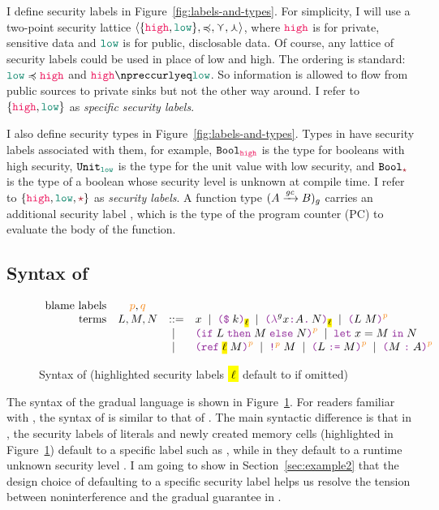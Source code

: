 I define security labels in Figure~\ref{fig:labels-and-types}. For simplicity, I
will use a two-point security lattice $\langle \{\high, \low\} , \preccurlyeq,
\curlyvee , \curlywedge \rangle$, where $\high$ is for private, sensitive data
and $\low$ is for public, disclosable data. Of course, any lattice of security
labels could be used in place of low and high. The ordering is standard: $\low
\preccurlyeq \high$ and $\high \npreccurlyeq \low$. So information is allowed to
flow from public sources to private sinks but not the other way around. I refer
to $\{\high,\low\}$ as \emph{specific security labels}.

I also define security types in Figure~\ref{fig:labels-and-types}. Types in
\Surface have security labels associated with them, for example, $\Bool_{\high}$
is the type for booleans with high security, $\Unit_{\low}$ is the type for the
unit value with low security, and $\Bool_{\unk}$ is the type of a boolean whose
security level is unknown at compile time. I refer to $\{\high,\low,\unk\}$ as
\emph{security labels}. A function type $({A}\xrightarrow{{\mathit{gc}}}{B})_g$ carries an
additional security label \gc, which is the type of the program counter (PC) to
evaluate the body of the function.

\subsection{Syntax of \Surface}
\label{sec:surface-syntax}

\begin{figure}[tbp]
\raggedright
  {\small
  \[
  \begin{array}{rcll}
    \text{blame labels}         & \bl{p}, \bl{q}     &      & \\
    \text{terms}                & L , M , N & ::=  & x \MID \const{k}{\text{\hl{$\ell$}}} \MID \lam{g}{x}{A}{N}{\text{\hl{$\ell$}}} \MID \app{L}{M}{p} \\
    &                                       & \MID & \ifexp{L}{M}{N}{p} \MID \letexp{x}{M}{N} \\
    &                                       & \MID & \refexp{\text{\hl{$\ell$}}}{M}{p} \MID \deref{M}{p} \MID \assign{L}{M}{p} \MID \ann{M}{A}{p}
  \end{array}
  \]}
  \caption{Syntax of \Surface (highlighted security labels \hl{$\ell$} default to \low if omitted)}
  \label{fig:surface-syntax}
\end{figure}

%
The syntax of the gradual language \Surface is shown in
Figure~\ref{fig:surface-syntax}. For readers familiar with \GSLRef, the syntax
of \Surface is similar to that of \GSLRef. The main syntactic difference is that
in \Surface, the security labels of literals and newly created memory cells
(highlighted in Figure~\ref{fig:surface-syntax}) default to a specific label
such as \low, while in \GSLRef they default to a runtime unknown security level
\unk. I am going to show in Section~\ref{sec:example2} that the design choice of
defaulting to a specific security label helps us resolve the tension between
noninterference and the gradual guarantee in \Surface.

